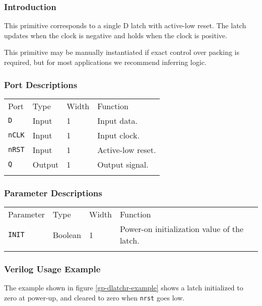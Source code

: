 \documentclass[11pt]{article}
\newcommand{\tokenstyle}[1]{\texttt{#1}}
\newcommand{\wirestyle}[1]{\texttt{#1}}
\newcommand{\whenstyle}[1]{{\fontseries{sb}\selectfont#1}}
\newcommand{\thinhline}{\Xhline{1\arrayrulewidth}}
\newcommand{\thickhline}{\Xhline{2.5\arrayrulewidth}}
\begin{document}
\subsubsection{Introduction}
This primitive corresponds to a single D latch with active-low reset. The latch updates when the clock is negative and holds
when the clock is positive.

This primitive may be manually instantiated if exact control over packing is required, but for most applications we
recommend inferring logic.

\subsubsection{Port Descriptions}

\begin{tabularx}{\textwidth}{lllX}
\thinhline
\whenstyle{Port} & \whenstyle{Type} & \whenstyle{Width} & \whenstyle{Function} \\
\thickhline
\tokenstyle{D} & Input & 1 & Input data. \\
\thinhline
\tokenstyle{nCLK} & Input & 1 & Input clock. \\
\thinhline
\tokenstyle{nRST} & Input & 1 & Active-low reset. \\
\thinhline
\tokenstyle{Q} & Output & 1 & Output signal. \\
\thinhline
\end{tabularx}

\subsubsection{Parameter Descriptions}

\begin{tabularx}{\textwidth}{lllX}
\thinhline
\whenstyle{Parameter} & \whenstyle{Type} & \whenstyle{Width} & \whenstyle{Function} \\
\thickhline
\tokenstyle{INIT} & Boolean & 1 & Power-on initialization value of the latch.\\
\thinhline
\end{tabularx}

\subsubsection{Verilog Usage Example}

The example shown in figure \ref{gp-dlatchr-example} shows a latch initialized to zero at power-up, and cleared to zero
when \wirestyle{nrst} goes low.
\end{document}
